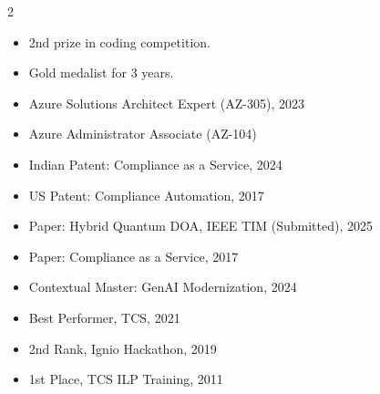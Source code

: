 \documentclass[10pt,a4paper,ragged2e,withhyper]{altacv}
\begin{document}
\begin{paracol}{2}
\begin{itemize}\vspace{-0.3em}
\item 2nd prize in coding competition.
\end{itemize}\vspace{-0.2em}

\begin{itemize}\vspace{-0.3em}
\item Gold medalist for 3 years.
\end{itemize}

\switchcolumn

{\LaTeXraggedright\vspace{-0.3em}
}

\begin{itemize}\vspace{-0.3em}
\item Azure Solutions Architect Expert (AZ-305), 2023
\item Azure Administrator Associate (AZ-104)
\end{itemize}

\begin{itemize}\vspace{-0.3em}
\item Indian Patent: Compliance as a Service, 2024
\item US Patent: Compliance Automation, 2017
\item Paper: Hybrid Quantum DOA, IEEE TIM (Submitted), 2025
\item Paper: Compliance as a Service, 2017
\end{itemize}

\begin{itemize}\vspace{-0.3em}
\item Contextual Master: GenAI Modernization, 2024
\item Best Performer, TCS, 2021
\item 2nd Rank, Ignio Hackathon, 2019
\item 1st Place, TCS ILP Training, 2011
\end{itemize}

\end{paracol}
\end{document}
